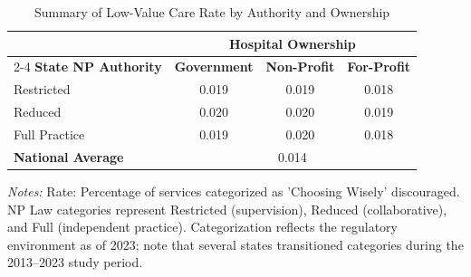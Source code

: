 \begin{table}[htbp]
    \centering
    \caption{Summary of Low-Value Care Rate by Authority and Ownership}
    \label{tab:partb_low_value_rate}
    \vspace{0.2cm}
    \begin{tabular}{lccc}
        \toprule
        & \multicolumn{3}{c}{\textbf{Hospital Ownership}} \\
        \cmidrule(lr){2-4}
        \textbf{State NP Authority} & \textbf{Government} & \textbf{Non-Profit} & \textbf{For-Profit} \\
        \midrule
        Restricted & 0.019 & 0.019 & 0.018 \\
        Reduced & 0.020 & 0.020 & 0.019 \\
        Full Practice & 0.019 & 0.020 & 0.018 \\
        \midrule
        \textbf{National Average} & \multicolumn{3}{c}{0.014} \\
        \bottomrule
    \end{tabular}
    \vspace{0.1cm}
    \begin{minipage}{0.85\textwidth}
        \footnotesize \textit{Notes:} Rate: Percentage of services categorized as 'Choosing Wisely' discouraged. NP Law categories represent Restricted (supervision), Reduced (collaborative), and Full (independent practice). Categorization reflects the regulatory environment as of 2023; note that several states transitioned categories during the 2013--2023 study period.
    \end{minipage}
\end{table}